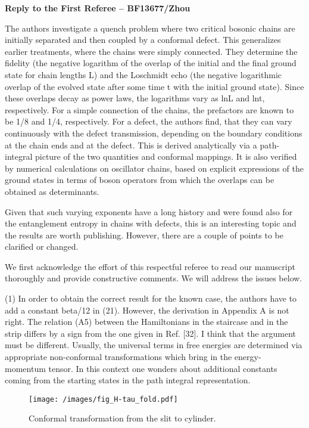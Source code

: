 \documentclass{article}
\newcommand{\reply}[1]{{\color{black}#1}}
\begin{document}
\large

{\bf Reply to the First Referee -- BF13677/Zhou}

\color{blue}

The authors investigate a quench problem where two critical bosonic chains are initially separated and then coupled by a conformal defect. This generalizes earlier treatments, where the chains were simply connected. They determine the fidelity (the negative logarithm of the overlap of the initial and the final ground state for chain lengths L) and the Loschmidt echo (the negative logarithmic overlap of the evolved state after some time t with the initial ground state). Since these overlaps decay as power laws, the logarithms vary as lnL and lnt, respectively. For a simple connection of the chains, the prefactors are known to be 1/8 and 1/4, respectively. For a defect, the authors find, that they can vary continuously with the defect transmission, depending on the boundary conditions at the chain ends and at the defect. This is derived analytically via a path- integral picture of the two quantities and conformal mappings. It is also verified by numerical calculations on oscillator chains, based on explicit expressions of the ground states in terms of boson operators from which the overlaps can be obtained as determinants.

Given that such varying exponents have a long history and were found also for the entanglement entropy in chains with defects, this is an interesting topic and the results are worth publishing. However, there are a couple of points to be clarified or changed.

\reply{We first acknowledge the effort of this respectful referee to read our manuscript thoroughly and provide constructive comments. We will address the issues below.}

(1) In order to obtain the correct result for the known case, the authors have to add a constant beta/12 in (21). However, the derivation in Appendix A is not right. The relation (A5) between the Hamiltonians in the staircase and in the strip differs by a sign from the one given in Ref. [32]. I think that the argument must be different. Usually, the universal terms in free energies are determined via appropriate non-conformal transformations which bring in the energy- momentum tensor. In this context one wonders about additional constants coming from the starting states in the path integral representation.

\begin{figure}[h]
\centering
\texttt{[image: /images/fig\_H-tau\_fold.pdf]}
\caption{Conformal transformation from the slit to cylinder.}
\label{fig:H-tau_fold}
\end{figure}
\end{document}
